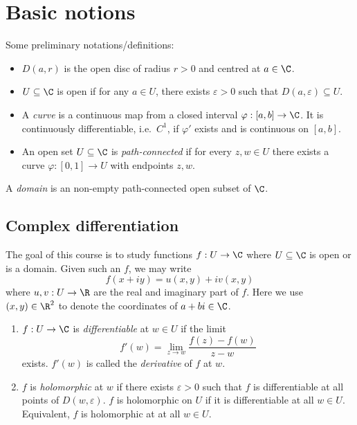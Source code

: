 \documentclass[a4paper]{article}
\begin{document}


\tableofcontents

\section{Basic notions}

Some preliminary notations/definitions:

\begin{notation}\leavevmode
  \begin{itemize}
  \item \(D(a, r)\) is the open disc of radius \(r > 0\) and centred at \(a \in \C\).
  \item \(U \subseteq \C\) is open if for any \(a \in U\), there exists \(\varepsilon > 0\) such that \(D(a, \varepsilon) \subseteq U\).
  \item A \emph{curve} is a continuous map from a closed interval \(\varphi: [a, b] \to \C\). It is continuously differentiable, i.e.\ \(C^1\), if \(\varphi'\) exists and is continuous on \([a, b]\).
  \item An open set \(U \subseteq \C\) is \emph{path-connected} if for every \(z, w \in U\) there exists a curve \(\varphi: [0, 1] \to U\) with endpoints \(z, w\).
  \end{itemize}
\end{notation}

\begin{definition}[Domain]
  A \emph{domain} is an non-empty path-connected open subset of \(\C\).
\end{definition}

\subsection{Complex differentiation}

The goal of this course is to study functions \(f: U \to \C\) where \(U \subseteq \C\) is open or is a domain. Given such an \(f\), we may write
\[
  f(x + iy) = u(x, y) + iv(x, y)
\]
where \(u, v: U \to \R\) are the real and imaginary part of \(f\). Here we use \((x, y) \in \R^2\) to denote the coordinates of \(a + bi \in \C\).

\begin{definition}\leavevmode
  \begin{enumerate}
  \item \(f: U \to \C\) is \emph{differentiable} at \(w \in U\) if the limit
    \[
      f'(w) = \lim_{z \to w} \frac{f(z) - f(w)}{z - w}
    \]
    exists. \(f'(w)\) is called the \emph{derivative} of \(f\) at \(w\).
  \item \(f\) is \emph{holomorphic} at \(w\) if there exists \(\varepsilon > 0\) such that \(f\) is differentiable at all points of \(D(w, \varepsilon)\). \(f\) is holomorphic on \(U\) if it is differentiable at all \(w \in U\). Equivalent, \(f\) is holomorphic at at all \(w \in U\).
  \end{enumerate}
\end{definition}
\end{document}
